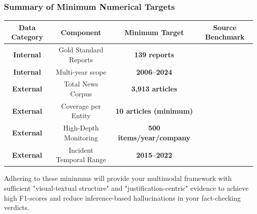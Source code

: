 \documentclass{article}
\begin{document}
\subsubsection{Summary of Minimum Numerical Targets}
\begin{table}[h!]
\centering
\begin{tabular}{|c|c|c|c|}
\hline
Data Category & Component & Minimum Target & Source Benchmark \\ \hline
\textbf{Internal} & Gold Standard Reports & \textbf{139 reports} &  \parencite{jacob_beck_9548a833} \\ \hline
\textbf{Internal} & Multi-year scope & \textbf{2006–2024} &  \parencite{bingjie_li_487d69fd} \\ \hline
\textbf{External} & Total News Corpus & \textbf{3,913 articles} &  \parencite{mariya_pavlova_259be499} \\ \hline
\textbf{External} & Coverage per Entity & \textbf{10 articles (minimum)} &  \parencite{sergio_consoli_fa6a8a6b} \\ \hline
\textbf{External} & High-Depth Monitoring & \textbf{500 items/year/company} &  \parencite{naiara_pikatza_gorrotxategi_17f5b4de} \\ \hline
\textbf{External} & Incident Temporal Range & \textbf{2015–2022} &  \parencite{abir_naskar_17efeb7b} \\ \hline
\end{tabular}
\end{table}

Adhering to these minimums will provide your multimodal framework with sufficient "visual-textual structure"  \parencite{lars_wilhelmi_8d7e860b} and "justification-centric" evidence  \parencite{kaoukis__georgios_35bab107} to achieve high F1-scores and reduce inference-based hallucinations in your fact-checking verdicts.
\printbibliography
\end{document}
